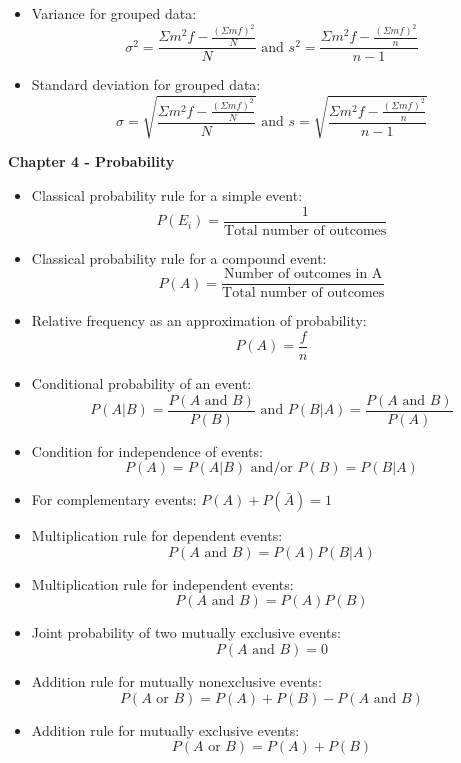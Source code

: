 \documentclass[a4paper, 10pt]{article}
\begin{document}
\begin{multicols}{2}
\begin{itemize}
    \item Variance for grouped data: \\ \font=9pt
    \[ \sigma^2 = \frac{\Sigma m^2f - \frac{(\Sigma mf)^2}{N}}{N} \textrm{ and } s^2 = \frac{\Sigma m^2f - \frac{(\Sigma mf)^2}{n}}{n-1} \] \font=2pt
    \item Standard deviation for grouped data: \\ \font=4pt
    \[ \sigma = \sqrt{\frac{\Sigma m^2f - \frac{(\Sigma mf)^2}{N}}{N}} \textrm{ and } s = \sqrt{\frac{\Sigma m^2f - \frac{(\Sigma mf)^2}{n}}{n-1}} \] \font=2pt
\end{itemize}
\textbf{Chapter 4 - Probability}
\begin{itemize} 
	\setlength\itemsep{1em}
    \item Classical probability rule for a simple event:
    	\[ P(E_i) = \frac{1}{\textrm{Total number of outcomes}} \]
	\item Classical probability rule for a compound event: 
    	\[ P(A) = \frac{\textrm{Number of outcomes in A}}{\textrm{Total number of outcomes}} \]
    \item Relative frequency as an approximation of probability: 
    	\[ P(A) = \frac{f}{n} \]
    \item Conditional probability of an event: \font=4pt
    	\[ P(A|B) = \frac{P(A \textrm{ and } B)}{P(B)} \textrm{ and } P(B|A) = \frac{P(A \textrm{ and } B)}{P(A)} \] \font=2pt
    \item Condition for independence of events: \font=8pt
    	\[ P(A) = P(A|B) \textrm{ and/or } P(B) = P(B|A) \] \font=2pt
    \item For complementary events: $ P(A) + P(\bar{A}) = 1 $
    \item Multiplication rule for dependent events: 
    	\[ P(A \textrm{ and } B) = P(A) P(B|A) \]
    \item Multiplication rule for independent events:
    	\[ P(A \textrm{ and } B) = P(A) P(B) \]
    \item Joint probability of two mutually exclusive events: 
    	\[ P(A \textrm{ and } B) = 0 \]
    \item Addition rule for mutually nonexclusive events:
    	\[ P(A \textrm{ or } B) = P(A) + P(B) - P(A \textrm{ and } B) \]
    \item Addition rule for mutually exclusive events:
    	\[ P(A \textrm{ or } B) = P(A) + P(B) \]
\end{itemize}

\end{multicols}
\end{document}
